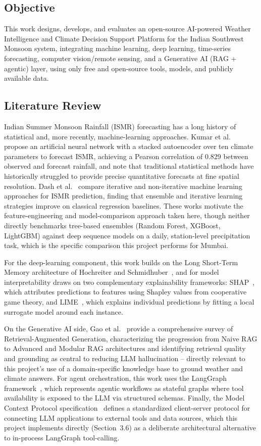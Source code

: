 \documentclass[11pt]{article}
\begin{document}
\subsection{Objective}
This work designs, develops, and evaluates an open-source AI-powered Weather Intelligence and Climate Decision Support Platform for the Indian Southwest Monsoon system, integrating machine learning, deep learning, time-series forecasting, computer vision/remote sensing, and a Generative AI (RAG + agentic) layer, using only free and open-source tools, models, and publicly available data.

\subsection{Literature Review}
Indian Summer Monsoon Rainfall (ISMR) forecasting has a long history of statistical and, more recently, machine-learning approaches. Kumar et al.~\cite{kumar2025ann} propose an artificial neural network with a stacked autoencoder over ten climate parameters to forecast ISMR, achieving a Pearson correlation of 0.829 between observed and forecast rainfall, and note that traditional statistical methods have historically struggled to provide precise quantitative forecasts at fine spatial resolution. Dash et al.~\cite{dash2018comparison} compare iterative and non-iterative machine learning approaches for ISMR prediction, finding that ensemble and iterative learning strategies improve on classical regression baselines. These works motivate the feature-engineering and model-comparison approach taken here, though neither directly benchmarks tree-based ensembles (Random Forest, XGBoost, LightGBM) against deep sequence models on a daily, station-level precipitation task, which is the specific comparison this project performs for Mumbai.

For the deep-learning component, this work builds on the Long Short-Term Memory architecture of Hochreiter and Schmidhuber~\cite{hochreiter1997lstm}, and for model interpretability draws on two complementary explainability frameworks: SHAP~\cite{lundberg2017shap}, which attributes predictions to features using Shapley values from cooperative game theory, and LIME~\cite{ribeiro2016lime}, which explains individual predictions by fitting a local surrogate model around each instance.

On the Generative AI side, Gao et al.~\cite{gao2023rag} provide a comprehensive survey of Retrieval-Augmented Generation, characterizing the progression from Naive RAG to Advanced and Modular RAG architectures and identifying retrieval quality and grounding as central to reducing LLM hallucination -- directly relevant to this project's use of a domain-specific knowledge base to ground weather and climate answers. For agent orchestration, this work uses the LangGraph framework~\cite{langgraph2024}, which represents agentic workflows as stateful graphs where tool availability is exposed to the LLM via structured schemas. Finally, the Model Context Protocol specification~\cite{mcp2024} defines a standardized client-server protocol for connecting LLM applications to external tools and data sources, which this project implements directly (Section~3.6) as a deliberate architectural alternative to in-process LangGraph tool-calling.
\end{document}
